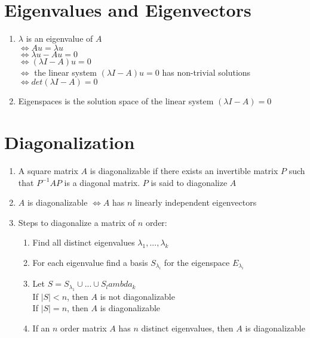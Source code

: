 \documentclass{article}
\begin{document}
\section*{Eigenvalues and Eigenvectors}
\begin{enumerate}
    \item $\lambda$ is an eigenvalue of $A$ \\
    $\Leftrightarrow Au = \lambda u$ \\
    $\Leftrightarrow \lambda u - Au = 0$ \\
    $\Leftrightarrow (\lambda I - A)u = 0$ \\
    $\Leftrightarrow$ the linear system $(\lambda I - A)u = 0$ has non-trivial solutions
    $\Leftrightarrow det(\lambda I - A) = 0$
    \item Eigenspaces is the solution space of the linear system $(\lambda I - A) = 0$
\end{enumerate}

\section*{Diagonalization}
\begin{enumerate}
    \item A square matrix $A$ is diagonalizable if there exists an invertible matrix $P$ such that $P^{-1}AP$ is a diagonal matrix. $P$ is said to diagonalize $A$
    \item $A$ is diagonalizable $\Leftrightarrow A$ has $n$ linearly independent eigenvectors
    \item Steps to diagonalize a matrix of $n$ order: \begin{enumerate}
        \item Find all distinct eigenvalues $\lambda_1, ..., \lambda_k$
        \item For each eigenvalue find a basis $S_\lambda_i$ for the eigenspace $E_\lambda_i$
        \item Let $S = S_\lambda_1 \cup ... \cup S_lambda_k$ \\
        If $|S| < n$, then $A$ is not diagonalizable \\
        If $|S| = n$, then $A$ is diagonalizable
        \item If an $n$ order matrix $A$ has $n$ distinct eigenvalues, then $A$ is diagonalizable
    \end{enumerate}
\end{enumerate}
\end{document}
